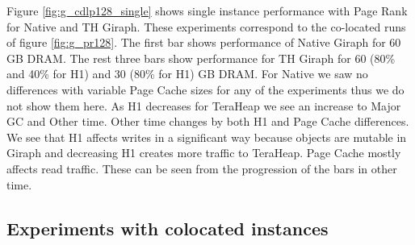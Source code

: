 Figure \ref{fig:g_cdlp128_single} shows single instance performance with Page Rank for Native and TH Giraph. These experiments correspond to the co-located runs of figure \ref{fig:g_pr128}. The first bar shows performance of Native Giraph for 60 GB DRAM. The rest three bars show performance for TH Giraph for 60 (80\% and 40\% for H1) and 30 (80\% for H1) GB DRAM. For Native we saw no differences with variable Page Cache sizes for any of the experiments thus we do not show them here. As H1 decreases for TeraHeap we see an increase to Major GC  and Other time. Other time changes by both H1 and Page Cache differences. We see that H1 affects writes in a significant way because objects are mutable in Giraph and decreasing H1 creates more traffic to TeraHeap. Page Cache mostly affects read traffic. These can be seen from the progression of the bars in other time.


\subsection{Experiments with colocated instances}

